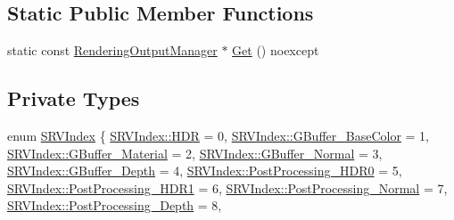 \subsection*{Static Public Member Functions}
\begin{DoxyCompactItemize}
\item 
static const \hyperlink{classmage_1_1_rendering_output_manager}{Rendering\+Output\+Manager} $\ast$ \hyperlink{classmage_1_1_rendering_output_manager_afc3d9dcc274a281e26110f6b43ec6c62}{Get} () noexcept
\end{DoxyCompactItemize}
\subsection*{Private Types}
\begin{DoxyCompactItemize}
\item 
enum \hyperlink{classmage_1_1_rendering_output_manager_a25aa12ba77bb160c5641cf54f7a68a29}{S\+R\+V\+Index} \{ \newline
\hyperlink{classmage_1_1_rendering_output_manager_a25aa12ba77bb160c5641cf54f7a68a29a6cad826248cd3f4e93da71e7b49928e3}{S\+R\+V\+Index\+::\+H\+DR} = 0, 
\hyperlink{classmage_1_1_rendering_output_manager_a25aa12ba77bb160c5641cf54f7a68a29af8aaa1436c06c671272ac08e4fa83309}{S\+R\+V\+Index\+::\+G\+Buffer\+\_\+\+Base\+Color} = 1, 
\hyperlink{classmage_1_1_rendering_output_manager_a25aa12ba77bb160c5641cf54f7a68a29abbdd76532c820b05b242d544cd1b43fd}{S\+R\+V\+Index\+::\+G\+Buffer\+\_\+\+Material} = 2, 
\hyperlink{classmage_1_1_rendering_output_manager_a25aa12ba77bb160c5641cf54f7a68a29af69e4b1698bc66624ab45f2c967406bb}{S\+R\+V\+Index\+::\+G\+Buffer\+\_\+\+Normal} = 3, 
\newline
\hyperlink{classmage_1_1_rendering_output_manager_a25aa12ba77bb160c5641cf54f7a68a29ae8964b7cf20037a91a4e9107f2b93db8}{S\+R\+V\+Index\+::\+G\+Buffer\+\_\+\+Depth} = 4, 
\hyperlink{classmage_1_1_rendering_output_manager_a25aa12ba77bb160c5641cf54f7a68a29af86c3f35d502a4de4cc2d4601a6fbbc4}{S\+R\+V\+Index\+::\+Post\+Processing\+\_\+\+H\+D\+R0} = 5, 
\hyperlink{classmage_1_1_rendering_output_manager_a25aa12ba77bb160c5641cf54f7a68a29a2136232aa9456009a7df9de7db662322}{S\+R\+V\+Index\+::\+Post\+Processing\+\_\+\+H\+D\+R1} = 6, 
\hyperlink{classmage_1_1_rendering_output_manager_a25aa12ba77bb160c5641cf54f7a68a29a224be169fd2e0ce4f53c6afa41ac4fe9}{S\+R\+V\+Index\+::\+Post\+Processing\+\_\+\+Normal} = 7, 
\newline
\hyperlink{classmage_1_1_rendering_output_manager_a25aa12ba77bb160c5641cf54f7a68a29a251bebd0602960f976f4a69dff9b13fe}{S\+R\+V\+Index\+::\+Post\+Processing\+\_\+\+Depth} = 8, 

\end{DoxyCompactItemize}
